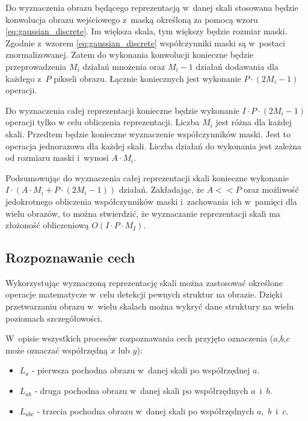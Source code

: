 Do wyznaczenia obrazu będącego reprezentacją w~danej skali stosowana będzie konwolucja obrazu wejściowego z~maską określoną za pomocą wzoru \ref{eq:gaussian_discrete}. Im większa skala, tym większy będzie rozmiar maski. Zgodnie z~wzorem \ref{eq:gaussian_discrete} współczynniki maski są w~postaci znormalizowanej. Zatem do wykonania konwolucji konieczne będzie przeprowadzenia $ M_i $ działań mnożenia oraz $ M_i - 1 $ działań dodawania dla każdego z~$P$ pikseli obrazu. Łącznie koniecznych jest wykonanie $ P \cdot (2M_i - 1) $ operacji.

Do wyznaczenia całej reprezentacji konieczne będzie wykonanie 
$ I \cdot P \cdot (2M_i - 1) $ operacji tylko w celu obliczenia reprezentacji. Liczba $ M_i $ jest różna dla każdej skali. Przedtem będzie konieczne wyznaczenie współczynników maski. Jest to operacja jednorazowa dla każdej skali. Liczba działań do wykonania jest zależna od rozmiaru maski i~wynosi $ A \cdot M_i $.

Podsumowując do wyznaczenia całej reprezentacji skali konieczne wykonanie $ I \cdot (A \cdot M_i + P \cdot (2M_i - 1)) $ działań. Zakładając, że $ A << P $ oraz możliwość jedokrotnego obliczenia współczynników maski i~zachowania ich w~pamięci dla wielu obrazów, to można stwierdzić, że wyznaczanie reprezentacji skali ma złożoność obliczeniową $ O(I \cdot P \cdot M_I) $.

\subsection{Rozpoznawanie cech}
\label{subsec:rozpoznawanie}

Wykorzystując wyznaczoną reprezentację skali można zastosować określone operacje matematycze w~celu detekcji pewnych struktur na obrazie. Dzięki przetwarzaniu obrazu w~wielu skalach można wykryć dane struktury na wielu poziomach szczegółowości.

W~opisie wszystkich procesów rozpoznawania cech przyjęto oznaczenia ($ a$,$ b$,$ c $ może oznaczać współrzędną $ x $ lub $ y $):

\begin{itemize}
\item $ L_a $ - pierwsza pochodna obrazu w~danej skali po współrzędnej $ a $.
\item $ L_{ab} $ - druga pochodna obrazu w~danej skali po współrzędnych $ a $~i~$b$.
\item $ L_{abc} $ - trzecia pochodna obrazu w~danej skali po współrzędnych $ a $,~$b$~i~$c$.
\end{itemize}

